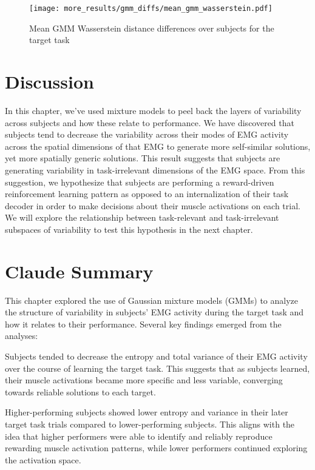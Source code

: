 \documentclass[../main.tex]{subfiles}
\begin{document}
\begin{figure}[!htb]
  \centering
    \texttt{[image: more\_results/gmm\_diffs/mean\_gmm\_wasserstein.pdf]}
    \caption[Mean GMM Wasserstein distance differences over subjects]{Mean GMM Wasserstein distance differences over subjects for the target task}\label{fig:wasserstein_vs_reward}
\end{figure}










\section{Discussion}

In this chapter, we've used mixture models to peel back the layers of variability across subjects and how these relate to performance. We have discovered that subjects tend to decrease the variability across their modes of EMG activity across the spatial dimensions of that EMG to generate more self-similar solutions, yet more spatially generic solutions. This result suggests that subjects are generating variability in task-irrelevant dimensions of the EMG space. From this suggestion, we hypothesize that subjects are performing a reward-driven reinforcement learning pattern as opposed to an internalization of their task decoder in order to make decisions about their muscle activations on each trial. We will explore the relationship between task-relevant and task-irrelevant subspaces of variability to test this hypothesis in the next chapter.

\section{Claude Summary}

This chapter explored the use of Gaussian mixture models (GMMs) to analyze the structure of variability in subjects' EMG activity during the target task and how it relates to their performance. Several key findings emerged from the analyses:

Subjects tended to decrease the entropy and total variance of their EMG activity over the course of learning the target task. This suggests that as subjects learned, their muscle activations became more specific and less variable, converging towards reliable solutions to each target.

Higher-performing subjects showed lower entropy and variance in their later target task trials compared to lower-performing subjects. This aligns with the idea that higher performers were able to identify and reliably reproduce rewarding muscle activation patterns, while lower performers continued exploring the activation space.
\end{document}
